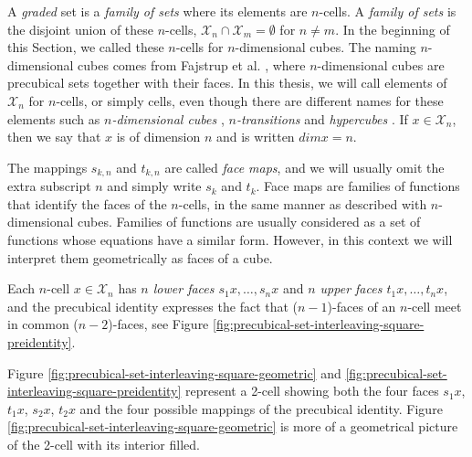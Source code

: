     A \emph{graded} set is a \emph{family of sets} where its elements are $n$-cells. A \emph{family of sets} is the disjoint union of these $n$-cells, $\mathcal{X}_n\cap \mathcal{X}_m= \emptyset$ for $n\ne m$. In the beginning of this Section, we called these $n$-cells for $n$-dimensional cubes. The naming $n$-dimensional cubes comes from Fajstrup et al. \cite{Fajstrup16DirectedAlgebraicTopologyConcurrency}, where $n$-dimensional cubes are precubical sets together with their faces. In this thesis, we will call elements of $\mathcal{X}_n$ for $n$-cells,  or simply cells, even though there are different names for these elements such as \emph{$n$-dimensional cubes} \cite{Pratt00Sculptures, Fajstrup16DirectedAlgebraicTopologyConcurrency}, \emph{$n$-transitions} \cite{Goubault95PhDThesis} and \emph{hypercubes} \cite{Glabbeek06HDA}. If $x \in \mathcal{X}_n$, then we say that $x$ is of dimension $n$ and is written $dim x = n$.
    
    The mappings $s_{ k, n}$ and $t_{ k, n}$  are called \emph{face maps}, and we will usually omit the extra subscript $n$ and simply write $s_k$ and $t_k$. Face maps are families of functions that identify the faces of the $n$-cells, in the same manner as described with $n$-dimensional cubes. Families of functions are usually considered as a set of functions whose equations have a similar form. However, in this context we will interpret them geometrically as faces of a cube.
    
    Each $n$-cell $x \in \mathcal{X}_n$ has \emph{$n$ lower faces $s_1 x,\dotsc, s_n x$} and \emph{$n$ upper faces $t_1 x,\dotsc, t_n x$}, and the precubical identity expresses the fact that ($n-1$)-faces of an $n$-cell meet in common ($n-2$)-faces, see Figure \ref{fig:precubical-set-interleaving-square-preidentity}.
    
    Figure \ref{fig:precubical-set-interleaving-square-geometric} and \ref{fig:precubical-set-interleaving-square-preidentity} represent a 2-cell showing both the four faces $s_1 x$, $t_1 x$, $s_2 x$, $t_2 x$ and the four possible mappings of the precubical identity. Figure \ref{fig:precubical-set-interleaving-square-geometric} is more of a geometrical picture of the 2-cell with its interior filled.
    
